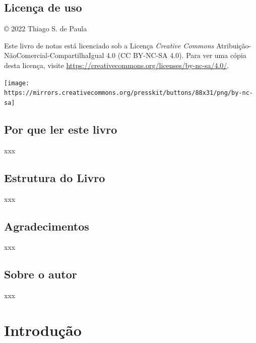 \documentclass[
]{book}
\begin{document}
\hypertarget{licenuxe7a-de-uso}{%
\section*{Licença de uso}\label{licenuxe7a-de-uso}}

© 2022 Thiago S. de Paula

Este livro de notas está licenciado sob a Licença \emph{Creative Commons} Atribuição-NãoComercial-CompartilhaIgual 4.0 (CC BY-NC-SA 4.0). Para ver uma cópia desta licença, visite \url{https://creativecommons.org/licenses/by-nc-sa/4.0/}.

\begin{flushleft}\texttt{[image: https://mirrors.creativecommons.org/presskit/buttons/88x31/png/by-nc-sa]} \end{flushleft}
\linebreak

\hypertarget{por-que-ler-este-livro}{%
\section*{Por que ler este livro}\label{por-que-ler-este-livro}}

xxx

\hypertarget{estrutura-do-livro}{%
\section*{Estrutura do Livro}\label{estrutura-do-livro}}

xxx

\hypertarget{agradecimentos}{%
\section*{Agradecimentos}\label{agradecimentos}}

xxx

\hypertarget{sobre-o-autor}{%
\section*{Sobre o autor}\label{sobre-o-autor}}

xxx

\hypertarget{introduuxe7uxe3o}{%
\chapter{Introdução}\label{introduuxe7uxe3o}}
\end{document}
